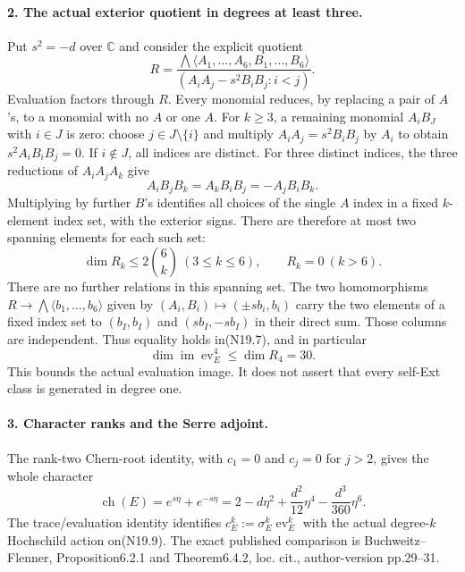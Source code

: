 \paragraph{2. The actual exterior quotient in degrees at least three.}
Put $s^2=-d$ over $\mathbb C$ and consider the explicit quotient
\[
 R=\frac{\bigwedge\langle A_1,\ldots,A_6,B_1,\ldots,B_6\rangle}
             {(A_iA_j-s^2B_iB_j:i<j)}.                         \tag{N19.5}
\]
Evaluation factors through $R$. Every monomial reduces, by replacing
a pair of $A$'s, to a monomial with no $A$ or one $A$.
For $k\ge3$, a remaining monomial $A_iB_J$ with $i\in J$ is zero:
choose $j\in J\setminus\{i\}$ and multiply
$A_iA_j=s^2B_iB_j$ by $A_i$ to obtain $s^2A_iB_iB_j=0$.
If $i\notin J$, all indices are distinct. For three distinct
indices, the three reductions of $A_iA_jA_k$ give
\[
                A_iB_jB_k=A_kB_iB_j=-A_jB_iB_k.                \tag{N19.6}
\]
Multiplying by further $B$'s identifies all choices of the single
$A$ index in a fixed $k$-element index set, with the exterior signs.
There are therefore at most two spanning elements for each such set:
\[
 \dim R_k\le2\binom6k\ (3\le k\le6),\qquad R_k=0\ (k>6).        \tag{N19.7}
\]
There are no further relations in this spanning set. The two
homomorphisms $R\to\bigwedge\langle b_1,\ldots,b_6\rangle$ given by
$(A_i,B_i)\mapsto(\pm s b_i,b_i)$ carry the two elements of a
fixed index set to $(b_I,b_I)$ and $(s b_I,-s b_I)$ in their
direct sum. Those columns are independent. Thus equality holds
in(N19.7), and in particular
\[
             \dim\operatorname{im}\operatorname{ev}_E^4
                           \le\dim R_4=30.                     \tag{N19.8}
\]
This bounds the actual evaluation image. It does not assert that
every self-Ext class is generated in degree one.

\paragraph{3. Character ranks and the Serre adjoint.}
The rank-two Chern-root identity, with $c_1=0$ and $c_j=0$ for
$j>2$, gives the whole character
\[
 \operatorname{ch}(E)=e^{s\eta}+e^{-s\eta}
   =2-d\eta^2+\frac{d^2}{12}\eta^4-\frac{d^3}{360}\eta^6.        \tag{N19.9}
\]
The trace/evaluation identity identifies
$c_E^k:=\sigma_E^k\operatorname{ev}_E^k$ with the actual
degree-$k$ Hochschild action on(N19.9). The exact published
comparison is Buchweitz--Flenner, Proposition6.2.1 and Theorem6.4.2,
loc. cit., author-version pp.29--31.

